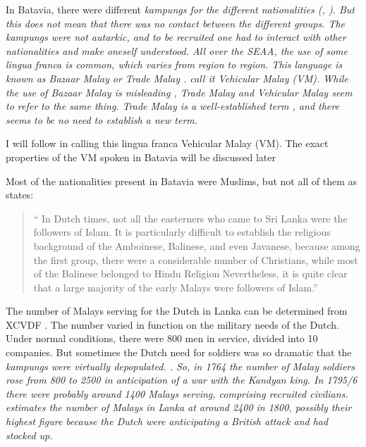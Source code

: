 In Batavia, there were different \em kampungs \em for the different nationalities (\citet[48,51f]{Hussainmiya1990}, \citet[cf.][11]{Hussainmiya1987}). But this does not mean that there was no contact between the different groups. The \em kampungs \em were not autarkic, and to be recruited one had to interact with other nationalities \kuckn and make oneself understood. All over the SEAA, the use of some lingua franca is common, which varies from region to region. This language is known as  Bazaar Malay  \citep{abc}  or Trade Malay  \citep{abc} . \citet{SmithEtAl2004} call it Vehicular Malay (VM). While the use of Bazaar Malay is misleading \kuckn, Trade Malay and Vehicular Malay seem to refer to the same thing. Trade Malay is a well-established term , and there seems to be no need to establish a new term.

I will follow \citet{SmithEtAl2004} in calling this lingua franca Vehicular Malay (VM). The exact properties of the VM spoken in Batavia will be discussed later

Most of the nationalities present in Batavia were Muslims, but not all of them as  \citet[58]{Hussainmiya1987} states:
\begin{quote}
    `` In Dutch times, not all the easterners who came to Sri Lanka were the followers of Islam. It is particularly difficult to establish the religious background of the Amboinese, Balinese, and even Javanese, because among the first group, there  were a considerable number of Christians, while most of the Balinese belonged to Hindu Religion \el Nevertheless, it is quite clear that a large majority of the early Malays were followers of Islam.''\citep[58]{Hussainmiya1987}
\end{quote}

The number of Malays serving for the Dutch in Lanka can be
determined from XCVDF \citep{abc} . The number varied in function on the
military needs of the Dutch. Under normal conditions, there were
800 men in service, divided into 10 companies.  But sometimes the
Dutch need for soldiers was so dramatic that the \em kampungs \em
were virtually depopulated. \citep[56]{Hussainmiya1987}. So, in
1764 the number of Malay soldiers rose from 800 to 2500 in
anticipation of a war with the Kandyan king. In 1795/6 there were
probably around 1400 Malays serving, comprising recruited
civilians. \citet[49f]{Hussainmiya1990} estimates the number of
Malays in Lanka  at around 2400 in 1800, possibly their highest
figure \citep[54]{Hussainmiya1987} because the Dutch were
anticipating a British attack and had stocked up.

